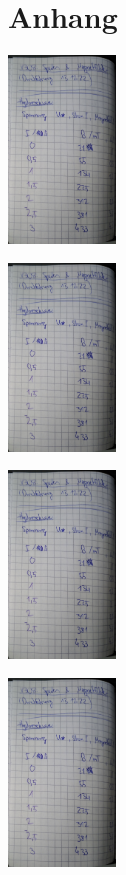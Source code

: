 \section*{Anhang}

\begin{minipage}[t]{0.4\textwidth}
    \includegraphics[height=5cm, page=1]{scans_messdaten/v308_Hysteresekurve.pdf}
\end{minipage}
\begin{minipage}[t]{0.4\textwidth}
    \includegraphics[height=5cm, keepaspectratio, page=2]{scans_messdaten/v308_Hysteresekurve.pdf}
\end{minipage}

\begin{minipage}[t]{0.4\textwidth}
    \includegraphics[height=5cm, page=3]{scans_messdaten/v308_Hysteresekurve.pdf}
\end{minipage}
\begin{minipage}[t]{0.4\textwidth}
    \includegraphics[height=5cm, page=4]{scans_messdaten/v308_Hysteresekurve.pdf}
\end{minipage}

